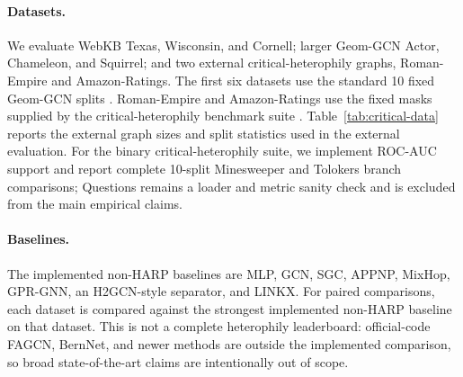 \documentclass[letterpaper]{article} %
\newcommand{\papertablesize}{\footnotesize}
\begin{document}
\paragraph{Datasets.}
We evaluate WebKB Texas, Wisconsin, and Cornell; larger Geom-GCN Actor, Chameleon, and Squirrel; and two external critical-heterophily graphs, Roman-Empire and Amazon-Ratings.
The first six datasets use the standard 10 fixed Geom-GCN splits \cite{pei2020geomgcn}.
Roman-Empire and Amazon-Ratings use the fixed masks supplied by the critical-heterophily benchmark suite \cite{platonov2023critical}.
Table~\ref{tab:critical-data} reports the external graph sizes and split statistics used in the external evaluation.
For the binary critical-heterophily suite, we implement ROC-AUC support and report complete 10-split Minesweeper and Tolokers branch comparisons; Questions remains a loader and metric sanity check and is excluded from the main empirical claims.

\begin{table}[t]
\centering
\caption{External critical-heterophily dataset statistics for split 0. Split lists train/validation/test counts; edges are undirected after symmetrization; Hom. is edge homophily.}
\label{tab:critical-data}
\begingroup
\setlength{\tabcolsep}{2pt}
\renewcommand{\arraystretch}{1.08}
\papertablesize
{}
\endgroup
\end{table}

\paragraph{Baselines.}
The implemented non-HARP baselines are MLP, GCN, SGC, APPNP, MixHop, GPR-GNN, an H2GCN-style separator, and LINKX.
For paired comparisons, each dataset is compared against the strongest implemented non-HARP baseline on that dataset.
This is not a complete heterophily leaderboard: official-code FAGCN, BernNet, and newer methods are outside the implemented comparison, so broad state-of-the-art claims are intentionally out of scope.
\end{document}
